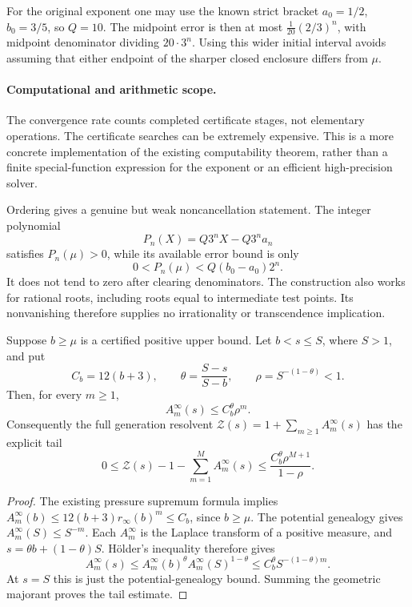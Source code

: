 For the original exponent one may use the known strict bracket
$a_0=1/2$, $b_0=3/5$, so $Q=10$. The midpoint error is then at most
$\tfrac1{20}(2/3)^n$, with midpoint denominator dividing $20\cdot3^n$.
Using this wider initial interval avoids assuming that either endpoint
of the sharper closed enclosure differs from $\mu$.

\paragraph{Computational and arithmetic scope.}
The convergence rate counts completed certificate stages, not elementary
operations. The certificate searches can be extremely expensive. This
is a more concrete implementation of the existing computability
theorem, rather than a finite special-function expression for the
exponent or an efficient high-precision solver.

Ordering gives a genuine but weak noncancellation statement. The integer
polynomial
\[
 P_n(X)=Q3^nX-Q3^na_n
\]
satisfies $P_n(\mu)>0$, while its available error bound is only
\[
 0<P_n(\mu)<Q(b_0-a_0)2^n.
\]
It does not tend to zero after clearing denominators. The construction
also works for rational roots, including roots equal to intermediate
test points. Its nonvanishing therefore supplies no irrationality or
transcendence implication.

\begin{proposition}
\label{rr:generation-tail}
Suppose $b\ge\mu$ is a certified positive upper bound. Let
$b<s\le S$, where $S>1$, and put
\[
 C_b=12(b+3),\qquad
 \theta=\frac{S-s}{S-b},\qquad
 \rho=S^{-(1-\theta)}<1.
\]
Then, for every $m\ge1$,
\begin{equation}\label{rr:holder-bound}
 A_m^\infty(s)\le C_b^{\theta}\rho^m.
\end{equation}
Consequently the full generation resolvent
$\mathcal Z(s)=1+\sum_{m\ge1}A_m^\infty(s)$ has the explicit tail
\begin{equation}\label{rr:generation-tail-bound}
 0\le\mathcal Z(s)-1-\sum_{m=1}^M A_m^\infty(s)
 \le\frac{C_b^{\theta}\rho^{M+1}}{1-\rho}.
\end{equation}
\end{proposition}

\begin{proof}
The existing pressure supremum formula implies
$A_m^\infty(b)\le12(b+3)r_\infty(b)^m\le C_b$, since $b\ge\mu$.
The potential genealogy gives $A_m^\infty(S)\le S^{-m}$.
Each $A_m^\infty$ is the Laplace transform of a positive measure, and
$s=\theta b+(1-\theta)S$. H\"older's inequality therefore gives
\[
 A_m^\infty(s)
 \le A_m^\infty(b)^\theta A_m^\infty(S)^{1-\theta}
 \le C_b^\theta S^{-(1-\theta)m}.
\]
At $s=S$ this is just the potential-genealogy bound. Summing the
geometric majorant proves the tail estimate.
\end{proof}

